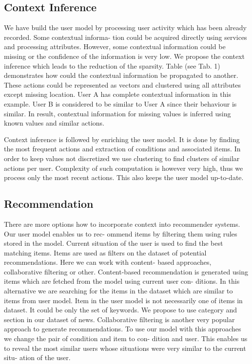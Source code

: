 \documentclass{acm_proc_article-sp} %
\begin{document}
\subsection{Context Inference}
We have build the user model by processing user activity
which has been already recorded. Some contextual informa-
tion could be acquired directly using services and processing
attributes. However, some contextual information could be
missing or the confidence of the information is very low. We
propose the context inference which leads to the reduction
of the sparsity. Table (see Tab. 1) demonstrates how could
the contextual information be propagated to another. These
actions could be represented as vectors and clustered using
all attributes except missing location. User A has complete
contextual information in this example. User B is considered
to be similar to User A since their behaviour is similar. In
result, contextual information for missing values is inferred
using known values and similar actions.

Context inference is followed by enriching the user model.
It is done by finding the most frequent actions and extraction
of conditions and associated items. In order to keep values
not discretized we use clustering to find clusters of similar
actions per user. Complexity of such computation is however
very high, thus we process only the most recent actions. This
also keeps the user model up-to-date.

\subsection{Recommendation}
There are more options how to incorporate context into
recommender systems. Our user model enables us to rec-
ommend items by filtering them using rules stored in the
model. Current situation of the user is used to find the best
matching items. Items are used as filters on the dataset of
potential recommendations. Here we can work with content-
based approaches, collaborative filtering or other.
Content-based recommendation is generated using items
which are fetched from the model using current user con-
ditions. In this alternative we are searching for the items
in the dataset which are similar to items from user model.
Item in the user model is not necessarily one of items in
dataset. It could be only the set of keywords. We propose
to use category and section in our dataset of news.
Collaborative filtering is another very popular approach
to generate recommendations. To use our model with this
approaches we change the pair of condition and item to con-
dition and user. This enables us to reveal the most similar
users whose situations were very similar to the current situ-
ation of the user.
\end{document}
